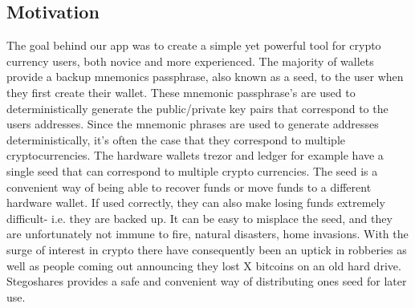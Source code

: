\subsection{Motivation}
The goal behind our app was to create a simple yet powerful tool for crypto currency users, both novice and more experienced. The majority of wallets provide a backup
mnemonics passphrase, also known as a seed, to the user when they first create their wallet. These mnemonic passphrase's are used to deterministically generate the public/private key
pairs that correspond to the users addresses. Since the mnemonic phrases are used to generate addresses deterministically, it's often the case that they correspond to multiple
cryptocurrencies. The hardware wallets trezor and ledger for example have a single seed that can correspond to multiple crypto currencies. The seed is a convenient way of being able
to recover funds or move funds to a different hardware wallet. If used correctly, they can also make losing funds extremely difficult- i.e. they are backed up. It can be easy to misplace the seed, and
they are unfortunately not immune to fire, natural disasters, home invasions. With the surge of interest in crypto there have consequently been an uptick in robberies as well as people
coming out announcing they lost X bitcoins on an old hard drive. Stegoshares provides a safe and convenient way of distributing ones seed for later use.


